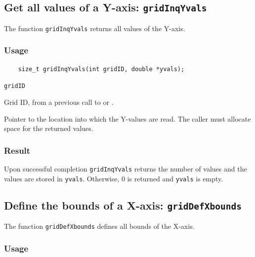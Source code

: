 \subsection{Get all values of a Y-axis: \texttt{gridInqYvals}}
\label{gridInqYvals}

The function {\texttt{gridInqYvals}} returns all values of the Y-axis.

\subsubsection*{Usage}

\begin{verbatim}
    size_t gridInqYvals(int gridID, double *yvals);
\end{verbatim}

\hspace*{4mm}\begin{minipage}[]{15cm}
\begin{deflist}{\texttt{gridID}\ }
\item[\texttt{gridID}]
Grid ID, from a previous call to {} or {}.
\item[\texttt{yvals}]
Pointer to the location into which the Y-values are read.
                    The caller must allocate space for the returned values.

\end{deflist}
\end{minipage}

\subsubsection*{Result}

Upon successful completion {\texttt{gridInqYvals}} returns the number of values and
the values are stored in {\texttt{yvals}}.
Otherwise, 0 is returned and {\texttt{yvals}} is empty.



\subsection{Define the bounds of a X-axis: \texttt{gridDefXbounds}}
\label{gridDefXbounds}

The function {\texttt{gridDefXbounds}} defines all bounds of the X-axis.

\subsubsection*{Usage}

